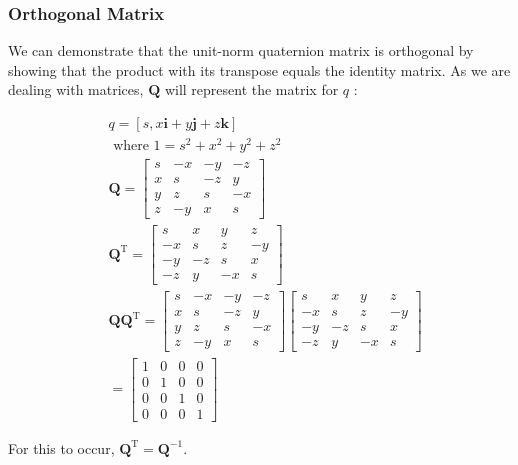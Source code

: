 \documentclass[10pt]{article}
\begin{document}
\subsubsection{Orthogonal Matrix}
We can demonstrate that the unit-norm quaternion matrix is orthogonal by showing that the product with its transpose equals the identity matrix. As we are dealing with matrices, $\mathbf{Q}$ will represent the matrix for $q$ :

$$
\begin{aligned}
& q=[s, x \mathbf{i}+y \mathbf{j}+z \mathbf{k}] \\
& \text { where } 1=s^{2}+x^{2}+y^{2}+z^{2} \\
& \mathbf{Q}=\left[\begin{array}{rrrr}
s & -x & -y & -z \\
x & s & -z & y \\
y & z & s & -x \\
z & -y & x & s
\end{array}\right] \\
& \mathbf{Q}^{\mathrm{T}}=\left[\begin{array}{rrrr}
s & x & y & z \\
-x & s & z & -y \\
-y & -z & s & x \\
-z & y & -x & s
\end{array}\right] \\
& \mathbf{Q} \mathbf{Q}^{\mathrm{T}}=\left[\begin{array}{rrrr}
s & -x & -y & -z \\
x & s & -z & y \\
y & z & s & -x \\
z & -y & x & s
\end{array}\right]\left[\begin{array}{rrrr}
s & x & y & z \\
-x & s & z & -y \\
-y & -z & s & x \\
-z & y & -x & s
\end{array}\right] \\
& =\left[\begin{array}{llll}
1 & 0 & 0 & 0 \\
0 & 1 & 0 & 0 \\
0 & 0 & 1 & 0 \\
0 & 0 & 0 & 1
\end{array}\right]
\end{aligned}
$$

For this to occur, $\mathbf{Q}^{\mathrm{T}}=\mathbf{Q}^{-1}$.
\end{document}
